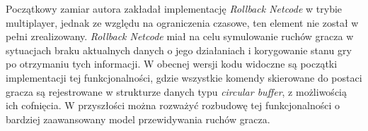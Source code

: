 Początkowy zamiar autora zakładał implementację \emph{Rollback Netcode} \cite{Rollback} w trybie multiplayer, jednak ze względu na ograniczenia czasowe, ten element nie został w pełni zrealizowany. \emph{Rollback Netcode} miał na celu symulowanie ruchów gracza w sytuacjach braku aktualnych danych o jego działaniach i korygowanie stanu gry po otrzymaniu tych informacji. W obecnej wersji kodu widoczne są początki implementacji tej funkcjonalności, gdzie wszystkie komendy skierowane do postaci gracza są rejestrowane w strukturze danych typu \emph{circular buffer}, z możliwością ich cofnięcia. W przyszłości można rozważyć rozbudowę tej funkcjonalności o bardziej zaawansowany model przewidywania ruchów gracza.